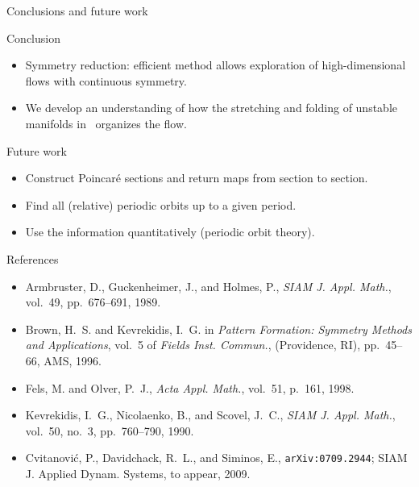 \documentclass{beamer}
\begin{document}
 \begin{frame}{Conclusions and future work}
 
\begin{block}{Conclusion}
  \begin{itemize}
   \item Symmetry reduction: efficient method allows exploration of high-dimensional flows with continuous symmetry.
   \item We develop an understanding of how the stretching and folding
  	of unstable manifolds in \KSe\ organizes the flow.
  \end{itemize}
\end{block}


\begin{block}{Future work}
\begin{itemize}
  \item Construct Poincar\'e sections and return maps from section to section.
  \item Find all (relative) periodic orbits up to a given period.
  \item Use the information quantitatively (periodic orbit theory).
\end{itemize}
\end{block}

\end{frame}

\begin{frame}{References}

\begin{itemize}
 \item {\sc Armbruster, D.}, {\sc Guckenheimer, J.}, and {\sc Holmes, P.},{\em
  SIAM J. Appl. Math.}, vol.~49, pp.~676--691, 1989.
 \item {\sc Brown, H.~S.} and {\sc Kevrekidis, I.~G.} in {\em Pattern Formation: Symmetry
  Methods and Applications}, vol.~5 of {\em Fields Inst. Commun.}, (Providence, RI), pp.~45--66,
  AMS, 1996.
 \item {\sc Fels, M.} and {\sc Olver, P.~J.}, {\em Acta Appl. Math.}, vol.~51, p.~161, 1998.
 \item {\sc Kevrekidis, I.~G.}, {\sc Nicolaenko, B.}, and {\sc Scovel, J.~C.}, {\em SIAM J. Appl. Math.}, vol.~50, no.~3, pp.~760--790, 1990.
 \item {\sc Cvitanovi{\'c}, P.}, {\sc Davidchack, R.~L.}, and {\sc Siminos, E.},
  {\tt arXiv:0709.2944}; {SIAM J. Applied Dynam. Systems}, to appear,
  2009.

\end{itemize}


 
\end{frame}


% 
% 
\end{document}
